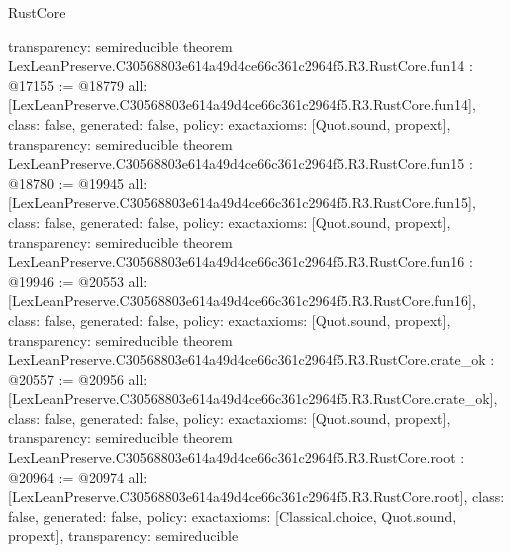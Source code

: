 \begin{lexlean}{RustCore}
\begin{coremodule}
{  transparency: semireducible
}
theorem LexLeanPreserve.C30568803e614a49d4ce66c361c2964f5.R3.RustCore.fun14 : @17155 := @18779 {
  all: [LexLeanPreserve.C30568803e614a49d4ce66c361c2964f5.R3.RustCore.fun14],
  class: false,
  generated: false,
  policy: exact{axioms: [Quot.sound, propext]},
  transparency: semireducible
}
theorem LexLeanPreserve.C30568803e614a49d4ce66c361c2964f5.R3.RustCore.fun15 : @18780 := @19945 {
  all: [LexLeanPreserve.C30568803e614a49d4ce66c361c2964f5.R3.RustCore.fun15],
  class: false,
  generated: false,
  policy: exact{axioms: [Quot.sound, propext]},
  transparency: semireducible
}
theorem LexLeanPreserve.C30568803e614a49d4ce66c361c2964f5.R3.RustCore.fun16 : @19946 := @20553 {
  all: [LexLeanPreserve.C30568803e614a49d4ce66c361c2964f5.R3.RustCore.fun16],
  class: false,
  generated: false,
  policy: exact{axioms: [Quot.sound, propext]},
  transparency: semireducible
}
theorem LexLeanPreserve.C30568803e614a49d4ce66c361c2964f5.R3.RustCore.crate_ok : @20557 := @20956 {
  all: [LexLeanPreserve.C30568803e614a49d4ce66c361c2964f5.R3.RustCore.crate_ok],
  class: false,
  generated: false,
  policy: exact{axioms: [Quot.sound, propext]},
  transparency: semireducible
}
theorem LexLeanPreserve.C30568803e614a49d4ce66c361c2964f5.R3.RustCore.root : @20964 := @20974 {
  all: [LexLeanPreserve.C30568803e614a49d4ce66c361c2964f5.R3.RustCore.root],
  class: false,
  generated: false,
  policy: exact{axioms: [Classical.choice, Quot.sound, propext]},
  transparency: semireducible
}


\end{coremodule}
\end{lexlean}
